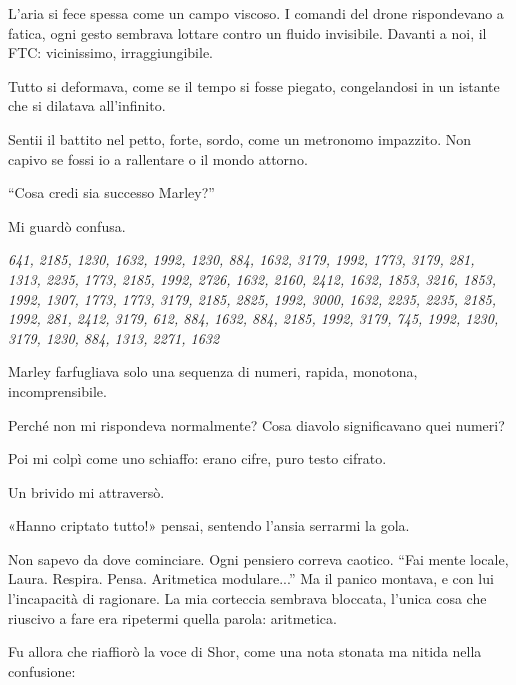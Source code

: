L'aria si fece spessa come un campo viscoso. I comandi del drone rispondevano a fatica, ogni gesto sembrava lottare contro un fluido invisibile. Davanti a noi, il FTC: vicinissimo, irraggiungibile.

Tutto si deformava, come se il tempo si fosse piegato, congelandosi in un istante che si dilatava all’infinito.

Sentii il battito nel petto, forte, sordo, come un metronomo impazzito. Non capivo se fossi io a rallentare o il mondo attorno.

\begin{dialogue}
 \enquote{Cosa credi sia successo Marley?}
\end{dialogue}

Mi guardò confusa.

\begin{dialogue}
 \begin{tcolorbox}[colback=white!95!blue!5, colframe=blue!75!black, title=\textbf{Messaggio di Marley}, fonttitle=\bfseries]
\emph{
641, 2185, 1230, 1632, 1992, 1230, 884, 1632, 3179, 1992, 1773, 3179, 281, 1313, 2235, 1773, 2185, 1992, 2726, 1632, 2160, 2412, 1632, 1853, 3216, 1853, 1992, 1307, 1773, 1773, 3179, 2185, 2825, 1992, 3000, 1632, 2235, 2235, 2185, 1992, 281, 2412, 3179, 612, 884, 1632, 884, 2185, 1992, 3179, 745, 1992, 1230, 3179, 1230, 884, 1313, 2271, 1632
}
\end{tcolorbox}

\end{dialogue}



Marley farfugliava solo una sequenza di numeri, rapida, monotona, incomprensibile.

Perché non mi rispondeva normalmente? Cosa diavolo significavano quei numeri?

Poi mi colpì come uno schiaffo: erano cifre, puro testo cifrato.

Un brivido mi attraversò.

«Hanno criptato tutto!» pensai, sentendo l’ansia serrarmi la gola.

Non sapevo da dove cominciare. Ogni pensiero correva caotico. ``Fai mente locale, Laura. Respira. Pensa. Aritmetica modulare...'' Ma il panico montava, e con lui l’incapacità di ragionare. La mia corteccia sembrava bloccata, l’unica cosa che riuscivo a fare era ripetermi quella parola: aritmetica.

Fu allora che riaffiorò la voce di Shor, come una nota stonata ma nitida nella confusione:

